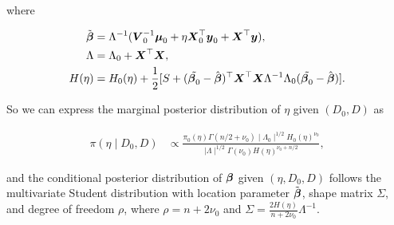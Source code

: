     where

    \begin{align*}
        \tilde{\boldsymbol{\beta}} &= \Lambda^{-1}(\boldsymbol{V}_0^{-1}\boldsymbol{\mu}_0 + \eta \boldsymbol{X}_0^\top \boldsymbol{y}_0 + \boldsymbol{X}^\top \boldsymbol{y}),
        \\
        \Lambda &= \Lambda_0 + \boldsymbol{X}^\top \boldsymbol{X},
        \\
        H(\eta) &= H_0(\eta) + \frac{1}{2}[S + (\tilde{\boldsymbol{\beta}_0} - \hat{\boldsymbol{\beta}})^\top \boldsymbol{X}^\top \boldsymbol{X} \Lambda^{-1} \Lambda_0 (\tilde{\boldsymbol{\beta}_0} - \hat{\boldsymbol{\beta}})].
    \end{align*}

    So we can express the marginal posterior distribution of $\eta$ given $(D_0, D)$ as

    \begin{align*}
        \pi(\eta \mid D_0, D) &\propto \frac{\pi_0(\eta) \Gamma(n/2 + \nu_0) \mid \Lambda_0 \mid^{1/2} H_0(\eta)^{\nu_0}}{\mid \Lambda \mid^{1/2} \Gamma(\nu_0) H(\eta)^{\nu_0 + n/2}},
    \end{align*}

    and the conditional posterior distribution of $\boldsymbol{\beta}$ given $(\eta, D_0, D)$ follows the multivariate Student distribution with location parameter $\tilde{\boldsymbol{\beta}}$, shape matrix $\Sigma$, and degree of freedom $\rho$, where $\rho = n+2\nu_0$ and $\Sigma = \frac{2H(\eta)}{n + 2\nu_0} \Lambda^{-1}$.